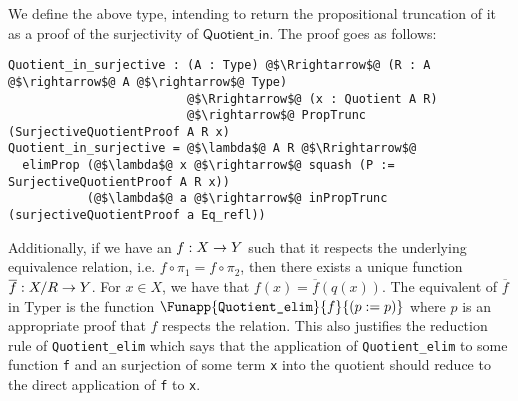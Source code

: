 \documentclass[12pt,twoside,maitrise]{dms}
\theoremstyle{definition}
\numberwithin{equation}{section}
\numberwithin{table}{chapter}
\numberwithin{figure}{chapter}
\newcommand\kw[1] {\textsf{#1}}
\newcommand\id[1] {\texttt{#1}}
\begin{document}
We define the above type, intending to return the propositional truncation of it
as a proof of the surjectivity of $\kw{Quotient\_in}$. The proof goes as
follows:

\begin{verbatim}
Quotient_in_surjective : (A : Type) @$\Rrightarrow$@ (R : A @$\rightarrow$@ A @$\rightarrow$@ Type)
                         @$\Rrightarrow$@ (x : Quotient A R)
                         @$\rightarrow$@ PropTrunc (SurjectiveQuotientProof A R x)
Quotient_in_surjective = @$\lambda$@ A R @$\Rrightarrow$@
  elimProp (@$\lambda$@ x @$\rightarrow$@ squash (P := SurjectiveQuotientProof A R x))
           (@$\lambda$@ a @$\rightarrow$@ inPropTrunc (surjectiveQuotientProof a Eq_refl))
\end{verbatim}

Additionally, if we have an $\oftype{f}{X \rightarrow Y}$ such that it respects
the underlying equivalence relation, i.e. $f \circ \pi_1 = f \circ \pi_2$, then
there exists a unique function $\oftype{\overline{f}}{X/R \rightarrow Y}$. For
$x \in X$, we have that $f(x) = \overline{f}(q(x))$. The equivalent of
$\overline{f}$ in Typer is the function
$\Funapp{\id{Quotient\_elim}}{f}{(\earg{p}{p})}$ where $p$ is an appropriate
proof that $f$ respects the relation. This also justifies the reduction rule of
\id{Quotient\_elim} which says that the application of \id{Quotient\_elim} to
some function \id{f} and an surjection of some term \id{x} into the quotient
should reduce to the direct application of \id{f} to \id{x}.
\end{document}
